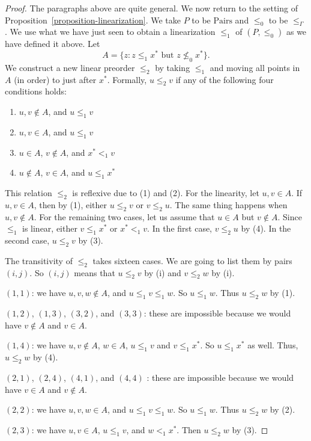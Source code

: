 \documentclass[letterpaper]{article}
\theoremstyle{definition}
\newcommand{\set}[1]{\{ #1 \}}
\newcommand{\Pairs}{\mbox{Pairs}}
\newcommand{\provle}{\le_{\Gamma}}
\begin{document}
\begin{proof}
The paragraphs above are quite general.   We now return to the
setting of Proposition~\ref{proposition-linearization}.
We take $P$ to be $\Pairs$
and $\leq_0$ to be $\provle$.
We use what we have just seen  to obtain a linearization $\leq_1$
of $(P,\leq_0)$
as we have defined it above.
Let \[ A = \set{z :  z \leq_1 x^*  \mbox{ but } z \nleq_0 x^*}.\]
We construct a new linear preorder $\leq_2$ by taking $\leq_1$ 
and moving all points in $A$ (in order) to just after $x^*$. 
Formally, $u \leq_2 v$ if any of the following four conditions holds:
\begin{enumerate}
    \item  $u,v\notin A$, and $u\leq_1 v$
    \item $u, v \in A$, and $u\leq_1 v$
        \item $u\in A$, $v\notin A$, and $x^* <_1 v$
    \item $u\notin A$, $v\in A$, and $u\leq_1 x^*$

\end{enumerate}
This relation $\leq_2$ is reflexive due to (1) and (2).
For the linearity, let $u, v\in A$.   If $u,v\in A$, then by (1), either $u \leq_2 v$ or $v\leq_2 u$.
The same thing happens when $u,v\notin A$.   For the remaining two cases, let us assume that $u\in A$ 
but $v\notin A$.     Since $\leq_1$ is linear, either $v \leq_1 x^*$ or $x^* <_1 v$.
In the first case, $v \leq_2 u$ by (4).   In the second case, $u\leq_2 v$ by (3).

\medskip

The transitivity of $\leq_2$ takes sixteen cases.  We are going to list them by pairs $(i,j)$.
So $(i,j)$ means that $u \leq_2 v$ by (i) and $v \leq_2 w$ by (i).


$(1,1)$: we have $u,v,w\notin A$,  and 
$u \leq_1 v \leq_1 w$.   So $u \leq_1 w$.    Thus  $u \leq_2 w$ by (1).

$(1,2)$, $(1,3)$, $(3,2)$, and $(3,3)$: these are impossible because we would have $v\notin A$ and $v\in A$.

 

$(1,4)$:  we have $u,v\notin A$, $w\in A$, $u\leq_1 v$ and $v \leq_1 x^*$.
So $u \leq_1 x^*$ as well. 
Thus, $u\leq_2 w$ by (4).

$(2,1)$, $(2,4)$,
$(4,1)$, and  $(4,4)$ : these are impossible  because we would have  $v\in A$ and $v\notin A$.


$(2,2)$: we have $u,v,w\in A$,  and 
$u \leq_1 v \leq_1 w$.   So $u \leq_1 w$.    Thus  $u \leq_2 w$ by (2).

$(2,3)$: we have $u,v\in A$, $u\leq_1 v$,  and $w <_1 x^*$. 
Then  $u \leq_2 w$ by (3).


\end{proof}
\end{document}
